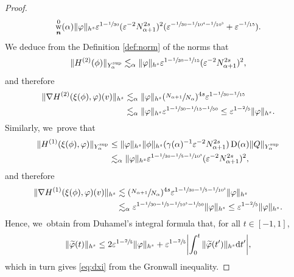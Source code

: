 \documentclass[JEP,XML,SOM,Unicode,published]{cedram}
\DeclareMathOperator{\rw}{w}
\theoremstyle{plain}
\theoremstyle{definition}
\newcommand{\nb}{{\boldsymbol n}}
\newcommand{\1}{\mathbf{1}}
\newcommand{\Ysup}[1]{Y_{#1}^{\mathrm{sup}}}
\let\epsilon\varepsilon
\begin{document}
\begin{proof}
\begin{align*}
\rw_{\nb}^{0}(\alpha)
\|\varphi\|_{h^{s}}
\epsilon^{1-\sfrac{1}{30}}
(\epsilon^{-2}N_{\alpha+1}^{2s})^{2}
(
\epsilon^{-\sfrac{1}{30}-\sfrac{1}{10^{4}}-\sfrac{1}{10^{3}}}+\epsilon^{-\sfrac{1}{15}}
).
\end{align*}
We deduce from the Definition \ref{def:norm} of the norms that\vspace*{-3pt}
\[
\|H^{(2)}(\phi)\|_{\Ysup{\alpha}}
\lesssim_{\alpha}
\|\varphi\|_{h^{s}}\epsilon^{1-\sfrac{1}{30}-\sfrac{1}{15}}(\epsilon^{-2}N_{\alpha+1}^{2s})^{2},
\]
and therefore\vspace*{-3pt}
\begin{equation*}
\begin{split}
\|\nabla H^{(2)}(\xi(\phi),\varphi)(v)\|_{h^{s}}
&\lesssim_{\alpha} \|\varphi\|_{h^{s}}(\sfrac{N_{\alpha+1}}{N_{\alpha}})^{4s}\epsilon^{1-\sfrac{1}{30}-\sfrac{1}{15}}\\
&\lesssim_{\alpha}\|\varphi\|_{h^{s}}
\epsilon^{1-\sfrac{1}{30}-\sfrac{1}{15}-\sfrac{1}{50}}
\leq \epsilon^{1-\sfrac{2}{5}}\|\varphi\|_{h^{s}}.
\end{split}
\end{equation*}
Similarly, we~prove that\vspace*{-3pt}
\begin{align*}
\|H^{(1)}(\xi(\phi),\varphi)\|_{\Ysup{\alpha}}
&\leq \|\varphi\|_{h^{s}}\|\phi\|_{h^{s}}(\gamma(\alpha)^{-1}\epsilon^{-2}N_{\alpha+1}^{2s})\operatorname{D}(\alpha)\|Q\|_{\Ysup{\alpha}} \\
&\lesssim_{\alpha}
\|\varphi\|_{h^{s}}
\epsilon^{1-\sfrac{1}{30}-\sfrac{1}{5}-\sfrac{1}{10^{3}}}(\epsilon^{-2}N_{\alpha+1}^{2s})^{2},
\end{align*}
and therefore\vspace*{-3pt}
\begin{equation*}
\begin{split}
\|\nabla H^{(1)}(\xi(\phi),\varphi)(v)\|_{h^{s}}
&\lesssim
(\sfrac{N_{\alpha+1}}{N_{\alpha}})^{4s}\epsilon^{1-\sfrac{1}{30}-\sfrac{1}{5}-\sfrac{1}{10^{3}}}
\|\varphi\|_{h^{s}}\\
&\lesssim_{\alpha}
\epsilon^{1-\sfrac{1}{30}-\sfrac{1}{5}-\sfrac{1}{10^{3}}-\sfrac{1}{50}}
\|\varphi\|_{h^{s}}
\leq
\epsilon^{1-\sfrac{2}{5}}\|\varphi\|_{h^{s}}.
\end{split}
\end{equation*}
Hence, we~obtain from Duhamel's integral formula that, for all $t\in[-1,1]$,\vspace*{-3pt}
\[
\|\widetilde{\varphi}(t)
\|_{h^{s}}
\leq
2\epsilon^{1-\sfrac{2}{5}}\|\varphi\|_{h^{s}} +\epsilon^{1-\sfrac{2}{5}}\biggl|\int_{0}^{t}\|\widetilde{\varphi}(t')\|_{h^{s}}\mathrm{d}t'\biggr|,
\]
which in turn gives \eqref{eq:dxi} from the Gronwall inequality.
\end{proof}
\end{document}
